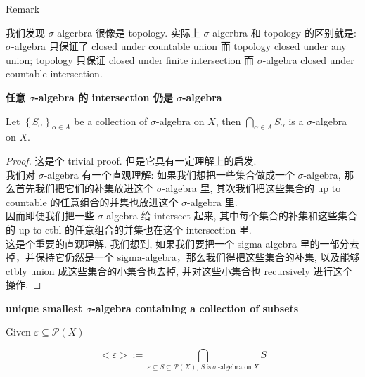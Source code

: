 \documentclass{qlnotes-export}
\begin{document}
\begin{qlremark}{Remark}

我们发现 \(\sigma\)-algerbra 很像是 topology. 实际上 \(\sigma\)-algerbra 和 topology 的区别就是: \(\sigma\)-algebra 只保证了 closed under countable union 而 topology closed under any union; topology 只保证 closed under finite intersection 而 \(\sigma\)-algebra closed under countable intersection.

\end{qlremark}

\begin{lemma}{\protect{}\label{kn-sigma-algebra-intersection-sigma-algebra}{\textbf{任意
\(\sigma\)-algebra 的 intersection 仍是 \(\sigma\)-algebra}}}

Let \(\left\{ S_{\alpha} \right\}_{\alpha \in A}\) be a collection of \(\sigma\)-algebra on \(X\), then \(\bigcap_{\alpha \in A}S_{\alpha}\) is a \(\sigma\)-algebra on \(X\).

\end{lemma}

\begin{proof}

这是个 trivial proof. 但是它具有一定理解上的启发.\\
我们对 \(\sigma\)-algebra 有一个直观理解: 如果我们想把一些集合做成一个 \(\sigma\)-algebra, 那么首先我们把它们的补集放进这个 \(\sigma\)-algebra 里, 其次我们把这些集合的 up to countable 的任意组合的并集也放进这个 \(\sigma\)-algebra 里.\\
因而即便我们把一些 \(\sigma\)-algebra 给 intersect 起来, 其中每个集合的补集和这些集合的 up to ctbl 的任意组合的并集也在这个 intersection 里.\\
这是个重要的直观理解. 我们想到, 如果我们要把一个 sigma-algebra 里的一部分去掉，并保持它仍然是一个 sigma-algebra，那么我们得把这些集合的补集, 以及能够 ctbly union 成这些集合的小集合也去掉, 并对这些小集合也 recursively 进行这个操作.

\end{proof}

\begin{corollary}{\protect{}\label{kn-unique-smallest-sigma-algebra-containing-a-collection-of-subsets}{\textbf{unique
smallest \(\sigma\)-algebra containing a collection of subsets}}}

Given \(\varepsilon \subseteq \mathcal{P}(X)\)

\[< \varepsilon > := \bigcap\limits_{\varepsilon \subseteq S \subseteq \mathcal{P}(X),\, S\ \text{is}\ \sigma\ \text{-algebra on}\ X}S\]

\end{corollary}
\end{document}
